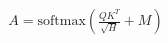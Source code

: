 \documentclass[preview]{standalone}
\begin{document}
\begin{align*}
A = \text{softmax}\!\left(\frac{QK^T}{\sqrt{H}} + M\right)
\end{align*}
\end{document}
